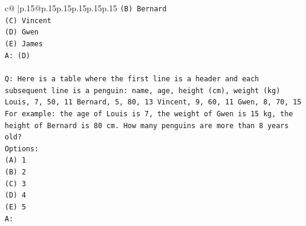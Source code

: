 \documentclass{article}
\begin{document}
{\begin{supertabular}{c@{$\;$}|p{.15\linewidth}@{}p{.15\linewidth}p{.15\linewidth}p{.15\linewidth}p{.15\linewidth}p{.15\linewidth}}
{{{\texttt{(B) Bernard} \\
\texttt{(C) Vincent} \\
\texttt{(D) Gwen} \\
\texttt{(E) James} \\
\texttt{A: (D)} \\
\\ 
\texttt{Q: Here is a table where the first line is a header and each subsequent line is a penguin:  name, age, height (cm), weight (kg) Louis, 7, 50, 11 Bernard, 5, 80, 13 Vincent, 9, 60, 11 Gwen, 8, 70, 15  For example: the age of Louis is 7, the weight of Gwen is 15 kg, the height of Bernard is 80 cm.  How many penguins are more than 8 years old?} \\
\texttt{Options:} \\
\texttt{(A) 1} \\
\texttt{(B) 2} \\
\texttt{(C) 3} \\
\texttt{(D) 4} \\
\texttt{(E) 5} \\
\texttt{A:} \\
            }
        }
    }
     \\ \\


\end{supertabular}}
\end{document}
